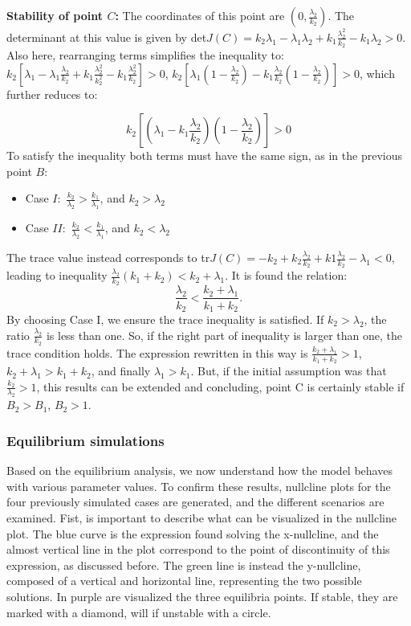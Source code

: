 \textbf{Stability of point $C$:} The coordinates of this point are $(0, \frac{\lambda_2}{k_2})$. The determinant at this value is given by det$J(C) = k_2 \lambda_1 - \lambda_1 \lambda_2 + k_1 \frac{\lambda_2^2}{k_2} - k_1 \lambda_2 > 0 $. Also here, rearranging terms simplifies the inequality to: $k_2 [\lambda_1 -\lambda_1 \frac{\lambda_2}{k_2} + k_1 \frac{\lambda_2^2}{k_2^2} - k_1 \frac{\lambda_2^2}{k_2}] >0$, $ k_2 [\lambda_1 ( 1 -  \frac{\lambda_2}{k_2}) - k_1 \frac{\lambda_2}{k_2} (1 - \frac{\lambda_2}{k_2})] >0$, which further reduces to:

\[
 k_2 [(\lambda_1 - k_1 \frac{\lambda_2}{k_2})(1 - \frac{\lambda_2}{k_2})] >0
\]
To satisfy the inequality both terms must have the same sign, as in the previous point $B$:
\begin{itemize}
	\item Case $I:$ $\frac{k_2}{\lambda_2} > \frac{k_1}{\lambda_1} $, and $k_2 > \lambda_2$
 	\item Case $II:$ $\frac{k_2}{\lambda_2} < \frac{k_1}{\lambda_1} $, and $k_2 < \lambda_2$
\end{itemize}
The trace value instead corresponds to tr$J(C) = - k_2 + k_2 \frac{\lambda_2}{k_2} + k1 \frac{\lambda_2}{k_2} - \lambda_1 < 0$, leading to inequality 
$ \frac{\lambda_2}{k_2} (k_1 + k_2) < k_2 + \lambda_1 $. It is found the relation:
\[ \frac{\lambda_2}{k_2} < \frac{k_2 +\lambda_1}{k_1 + k_2}.\]
By choosing Case I, we ensure the trace inequality is satisfied. If $k_2 > \lambda_2$, the ratio $\frac{\lambda_2}{k_2}$ is less than one. So, if the right part of inequality is larger than one, the trace condition holds. The expression rewritten in this way is $\frac{k_2 +\lambda_1}{k_1 + k_2} > 1$, $k_2 +\lambda_1 > k_1 + k_2 $, and finally $\lambda_1 > k_1$. But, if the initial assumption was that $ \frac{k_2 }{\lambda_2} > 1$, this results can be extended and concluding, point C is certainly stable if $B_2> B_1$, $B_2 > 1$.  
 
\subsubsection{Equilibrium simulations}

Based on the equilibrium analysis, we now understand how the model behaves with various parameter values. To confirm these results, nullcline plots for the four previously simulated cases are generated, and the different scenarios are examined. Fist, is important to describe what can be visualized in the nullcline plot. The blue curve is the expression found solving the x-nullcline, and the almost vertical line in the plot correspond to the point of discontinuity of this expression, as discussed before. The green line is instead the y-nullcline, composed of a vertical and horizontal line, representing the two possible solutions. In purple are visualized the three equilibria points. If stable, they are marked with a diamond, will if unstable with a circle.  
\\

